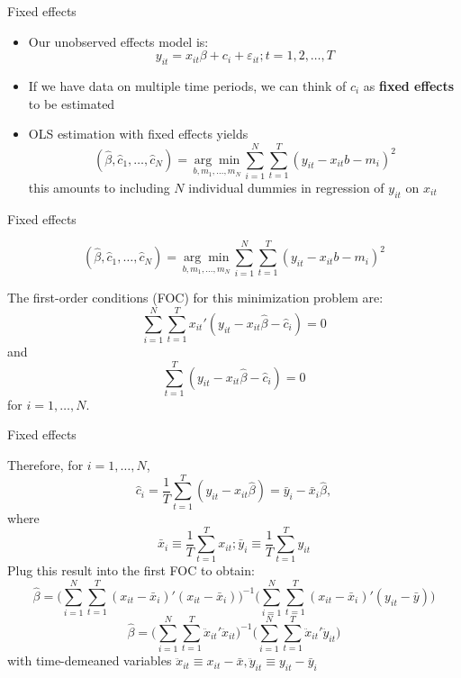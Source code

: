 \documentclass{beamer}
\begin{document}
\begin{frame}{Fixed effects}

	
	\begin{itemize}
	\item Our unobserved effects model is:$$y_{it} = x_{it}\beta + c_i + \varepsilon_{it}; t=1,2,\dots,T$$
	\item If we have data on multiple time periods, we can think of $c_i$ as \textbf{fixed effects} to be estimated
	\item OLS estimation with fixed effects yields$$(\widehat{\beta}, \widehat{c}_1, \dots, \widehat{c}_N) = \underset{b,m_1,\dots,m_N}{\arg\!\min} \sum_{i=1}^N\sum_{t=1}^T (y_{it} - x_{it}b - m_i)^2$$this amounts to including $N$ individual dummies in regression of $y_{it}$ on $x_{it}$
	\end{itemize}
\end{frame}

\begin{frame}{Fixed effects}
	
$$(\widehat{\beta}, \widehat{c}_1, \dots, \widehat{c}_N) = \underset{b,m_1,\dots,m_N}{\arg\!\min} \sum_{i=1}^N\sum_{t=1}^T (y_{it} - x_{it}b - m_i)^2$$

The first-order conditions (FOC) for this minimization problem are: $$\sum_{i=1}^N \sum_{t=1}^T x_{it}'(y_{it} - x_{it}\widehat{\beta} - \widehat{c}_i)=0$$ and $$\sum_{t=1}^T(y_{it} - x_{it}\widehat{\beta} - \widehat{c}_i) = 0 $$ for $i=1,\dots,N$.
	
\end{frame}

\begin{frame}{Fixed effects}
	
Therefore, for $i=1, \dots, N$,$$\widehat{c}_i = \frac{1}{T} \sum_{t=1}^T(y_{it}-x_{it}\widehat{\beta})=\bar{y}_i-\bar{x}_i\widehat{\beta},$$where$$\bar{x}_i \equiv \frac{1}{T}\sum_{t=1}^Tx_{it}; \bar{y}_i \equiv \frac{1}{T} \sum_{t=1}^T y_{it}$$
Plug this result into the first FOC to obtain:$$\widehat{\beta} = \bigg( \sum_{i=1}^N \sum_{t=1}^T (x_{it} - \bar{x}_i)'(x_{it} - \bar{x}_i) \bigg)^{-1} \bigg( \sum_{i=1}^N \sum_{t=1}^T (x_{it} - \bar{x}_i)'(y_{it} - \bar{y})\bigg)$$ $$\widehat{\beta} = \bigg(\sum_{i=1}^N \sum_{t=1}^T \ddot{x}_{it}'\ddot{x}_{it} \bigg)^{-1} \bigg( \sum_{i=1}^N \sum_{t=1}^T \ddot{x}_{it}' \ddot{y}_{it} \bigg)$$
with time-demeaned variables $\ddot{x}_{it} \equiv x_{it}-\bar{x},\ddot{y}_{it} \equiv y_{it} - \bar{y}_i$
\end{frame}
\end{document}
